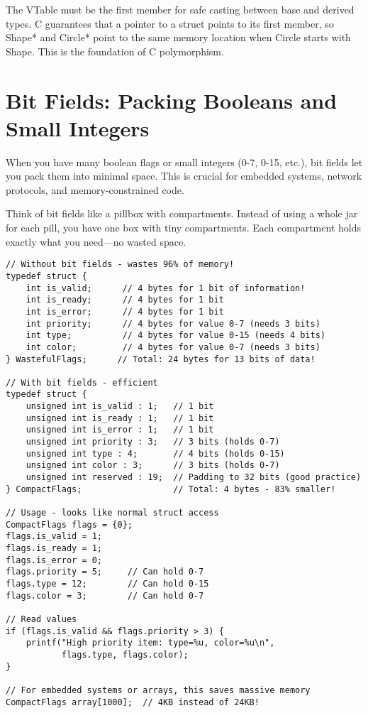 \begin{tipbox}
The VTable must be the first member for safe casting between base and derived types. C guarantees that a pointer to a struct points to its first member, so Shape* and Circle* point to the same memory location when Circle starts with Shape. This is the foundation of C polymorphism.
\end{tipbox}

\section{Bit Fields: Packing Booleans and Small Integers}

When you have many boolean flags or small integers (0-7, 0-15, etc.), bit fields let you pack them into minimal space. This is crucial for embedded systems, network protocols, and memory-constrained code.

Think of bit fields like a pillbox with compartments. Instead of using a whole jar for each pill, you have one box with tiny compartments. Each compartment holds exactly what you need---no wasted space.

\begin{lstlisting}
// Without bit fields - wastes 96% of memory!
typedef struct {
    int is_valid;      // 4 bytes for 1 bit of information!
    int is_ready;      // 4 bytes for 1 bit
    int is_error;      // 4 bytes for 1 bit
    int priority;      // 4 bytes for value 0-7 (needs 3 bits)
    int type;          // 4 bytes for value 0-15 (needs 4 bits)
    int color;         // 4 bytes for value 0-7 (needs 3 bits)
} WastefulFlags;      // Total: 24 bytes for 13 bits of data!

// With bit fields - efficient
typedef struct {
    unsigned int is_valid : 1;   // 1 bit
    unsigned int is_ready : 1;   // 1 bit
    unsigned int is_error : 1;   // 1 bit
    unsigned int priority : 3;   // 3 bits (holds 0-7)
    unsigned int type : 4;       // 4 bits (holds 0-15)
    unsigned int color : 3;      // 3 bits (holds 0-7)
    unsigned int reserved : 19;  // Padding to 32 bits (good practice)
} CompactFlags;                  // Total: 4 bytes - 83% smaller!

// Usage - looks like normal struct access
CompactFlags flags = {0};
flags.is_valid = 1;
flags.is_ready = 1;
flags.is_error = 0;
flags.priority = 5;     // Can hold 0-7
flags.type = 12;        // Can hold 0-15
flags.color = 3;        // Can hold 0-7

// Read values
if (flags.is_valid && flags.priority > 3) {
    printf("High priority item: type=%u, color=%u\n",
           flags.type, flags.color);
}

// For embedded systems or arrays, this saves massive memory
CompactFlags array[1000];  // 4KB instead of 24KB!
\end{lstlisting}

